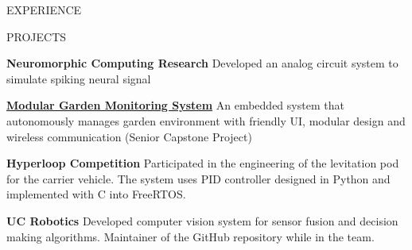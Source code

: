 \documentclass{lib/resume} %
\begin{document}
\begin{rSection}{EXPERIENCE}
\end{rSection}


\begin{rSection}{PROJECTS}
    \vspace{-1em}

    \item \textbf{Neuromorphic Computing Research} {Developed an analog circuit system to simulate spiking neural signal}
    \item \href{https://github.com/liu2z2/mgms}{\textbf{Modular Garden Monitoring System}} {An embedded system that autonomously manages garden environment with friendly UI, modular design and wireless communication (Senior Capstone Project)}
    \item \textbf{Hyperloop Competition} {Participated in the engineering of the levitation pod for the carrier vehicle. The system uses PID controller designed in Python and implemented with C into FreeRTOS.}
    \item \textbf{UC Robotics} {Developed computer vision system for sensor fusion and decision making algorithms. Maintainer of the GitHub repository while in the team.}

\end{rSection}

%
%
%
%
%
\end{document}
